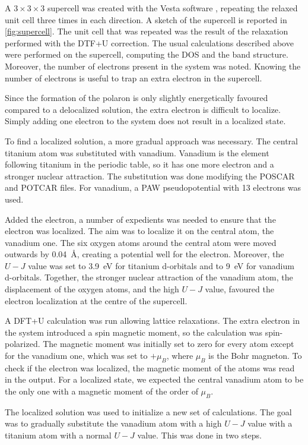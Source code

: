 A $3\times3\times3$ supercell was created with the Vesta software \cite{zotero-174}, repeating the relaxed unit cell three times in each direction. A sketch of the supercell is reported in \cref{fig:supercell}. The unit cell that was repeated was the result of the relaxation performed with the DTF+U correction. The usual calculations described above were performed on the supercell, computing the DOS and the band structure. Moreover, the number of electrons present in the system was noted. Knowing the number of electrons is useful to trap an extra electron in the supercell.

Since the formation of the polaron is only slightly energetically favoured compared to a delocalized solution, the extra electron is difficult to localize. Simply adding one electron to the system does not result in a localized state.

To find a localized solution, a more gradual approach was necessary. The central titanium atom was substituted with vanadium. Vanadium is the element following titanium in the periodic table, so it has one more electron and a stronger nuclear attraction. The substitution was done modifying the POSCAR and POTCAR files. For vanadium, a PAW pseudopotential with 13 electrons was used.

Added the electron, a number of expedients was needed to ensure that the electron was localized. The aim was to localize it on the central atom, the vanadium one. The six oxygen atoms around the central atom were moved outwards by \SI{0.04}{\angstrom}, creating a potential well for the electron. Moreover, the $U-J$ value was set to \SI{3.9}{eV} for titanium d-orbitals and to \SI{9}{eV} for vanadium d-orbitals. Together, the stronger nuclear attraction of the vanadium atom, the displacement of the oxygen atoms, and the high $U-J$ value, favoured the electron localization at the centre of the supercell.

A DFT+U calculation was run allowing lattice relaxations.  The extra electron in the system introduced a spin magnetic moment, so the calculation was spin-polarized. The magnetic moment was initially set to zero for every atom except for the vanadium one, which was set to $+\mu_B$, where $\mu_B$ is the Bohr magneton. To check if the electron was localized, the magnetic moment of the atoms was read in the output. For a localized state, we expected the central vanadium atom to be the only one with a magnetic moment of the order of $\mu_B$.

The localized solution was used to initialize a new set of calculations. The goal was to gradually substitute the vanadium atom with a high $U-J$ value with a titanium atom with a normal $U-J$ value. This was done in two steps.

